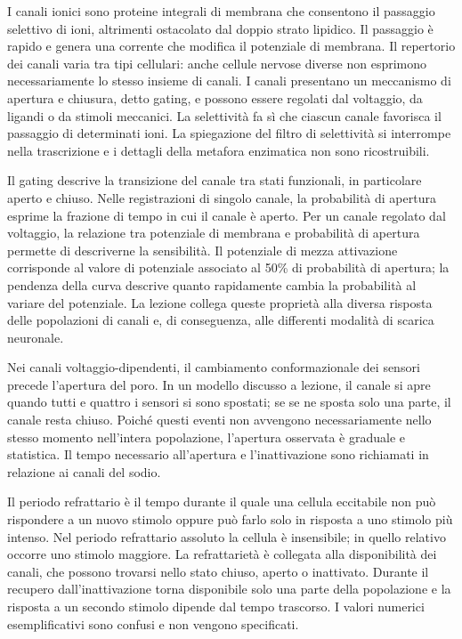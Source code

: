 I canali ionici sono proteine integrali di membrana che consentono il passaggio selettivo di ioni, altrimenti ostacolato dal doppio strato lipidico. Il passaggio è rapido e genera una corrente che modifica il potenziale di membrana. Il repertorio dei canali varia tra tipi cellulari: anche cellule nervose diverse non esprimono necessariamente lo stesso insieme di canali. I canali presentano un meccanismo di apertura e chiusura, detto gating, e possono essere regolati dal voltaggio, da ligandi o da stimoli meccanici. La selettività fa sì che ciascun canale favorisca il passaggio di determinati ioni. La spiegazione del filtro di selettività si interrompe nella trascrizione e i dettagli della metafora enzimatica non sono ricostruibili.

Il gating descrive la transizione del canale tra stati funzionali, in particolare aperto e chiuso. Nelle registrazioni di singolo canale, la probabilità di apertura esprime la frazione di tempo in cui il canale è aperto. Per un canale regolato dal voltaggio, la relazione tra potenziale di membrana e probabilità di apertura permette di descriverne la sensibilità. Il potenziale di mezza attivazione corrisponde al valore di potenziale associato al 50\% di probabilità di apertura; la pendenza della curva descrive quanto rapidamente cambia la probabilità al variare del potenziale. La lezione collega queste proprietà alla diversa risposta delle popolazioni di canali e, di conseguenza, alle differenti modalità di scarica neuronale.

Nei canali voltaggio-dipendenti, il cambiamento conformazionale dei sensori precede l'apertura del poro. In un modello discusso a lezione, il canale si apre quando tutti e quattro i sensori si sono spostati; se se ne sposta solo una parte, il canale resta chiuso. Poiché questi eventi non avvengono necessariamente nello stesso momento nell'intera popolazione, l'apertura osservata è graduale e statistica. Il tempo necessario all'apertura e l'inattivazione sono richiamati in relazione ai canali del sodio.

Il periodo refrattario è il tempo durante il quale una cellula eccitabile non può rispondere a un nuovo stimolo oppure può farlo solo in risposta a uno stimolo più intenso. Nel periodo refrattario assoluto la cellula è insensibile; in quello relativo occorre uno stimolo maggiore. La refrattarietà è collegata alla disponibilità dei canali, che possono trovarsi nello stato chiuso, aperto o inattivato. Durante il recupero dall'inattivazione torna disponibile solo una parte della popolazione e la risposta a un secondo stimolo dipende dal tempo trascorso. I valori numerici esemplificativi sono confusi e non vengono specificati.

